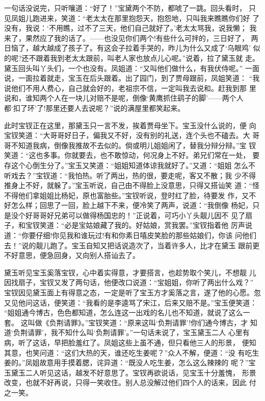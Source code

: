 一句话没说完，只听嚷道：“好了！”宝黛两个不防，都唬了一跳。回头看时，
只见凤姐儿跑进来，笑道：“老太太在那里抱怨天，抱怨地，只叫我来瞧瞧你们好
了没有，我说：‘不用瞧，过不了三天，他们自己就好了。’老太太骂我，说我懒；
我来了，果然应了我的话了。——也没见你们两个!有些什么可拌的，三日好了，
两日恼了，越大越成了孩子了。有这会子拉着手哭的，昨儿为什么又成了‘乌眼鸡’
似的呢?还不跟着我到老太太跟前，叫老人家也放点儿心呢。”说着，拉了黛玉就
走。黛玉回头叫丫头们，一个也没有。凤姐道：“又叫他们做什么，有我伏侍呢。”
一面说，一面拉着就走，宝玉在后头跟着。出了园门，到了贾母跟前，凤姐笑道：
“我说他们不用人费心，自己就会好的，老祖宗不信，一定叫我去说和。赶我到那
里说和，谁知两个人在一块儿对赔不是呢，倒像‘黄鹰抓住鹞子的脚’——两个人
都‘扣了环’了!那里还要人去说呢？”说的满屋里都笑起来。

此时宝钗正在这里，那黛玉只一言不发，挨着贾母坐下。宝玉没什么说的，便
向宝钗笑道：“大哥哥好日子，偏我又不好，没有别的礼送，连个头也不磕去。大
哥哥不知道我病，倒像我推故不去似的。倘或明儿姐姐闲了，替我分辩分辩。”宝
钗笑道：“这也多事。你就要去，也不敢惊动，何况身上不好。弟兄们常在一处，
要存这个心倒生分了。”宝玉又笑道：“姐姐知道体谅我就好了。”又道：“姐姐
怎么不听戏去？”宝钗道：“我怕热。听了两出，热的很，要走呢，客又不散；我
少不得推身上不好，就躲了。”宝玉听说，自己由不得脸上没意思，只得又搭讪笑
道：“怪不得他们拿姐姐比杨妃，原也富胎些。”宝钗听说，登时红了脸，待要发
作，又不好怎么样；回思了一回，脸上越下不来，便冷笑了两声，说道：“我倒像
杨妃，只是没个好哥哥好兄弟可以做得杨国忠的！”正说着，可巧小丫头靓儿因不
见了扇子，和宝钗笑道：“必是宝姑娘藏了我的。好姑娘，赏我罢。”宝钗指着他
厉声说道：“你要仔细!你见我和谁玩过!有和你素日嘻皮笑脸的那些姑娘们，你该
问他们去！”说的靓儿跑了。宝玉自知又把话说造次了，当着许多人，比才在黛玉
跟前更不好意思，便急回身，又向别人搭讪去了。

黛玉听见宝玉奚落宝钗，心中着实得意，才要搭言，也趁势取个笑儿，不想靓
儿因找扇子，宝钗又发了两句话，他便改口说道：“宝姐姐，你听了两出什么戏？”
宝钗因见黛玉面上有得意之态，一定是听了宝玉方才奚落之言，遂了他的心愿。忽
又见他问这话，便笑道：“我看的是李逵骂了宋江，后来又赔不是。”宝玉便笑道：
“姐姐通今博古，色色都知道，怎么连这一出戏的名儿也不知道，就说了这么一套。
这叫做《负荆请罪》。”宝钗笑道：“原来这叫‘负荆请罪’!你们通今博古，才
知道‘负荆请罪’，我不知什么叫‘负荆请罪’。”一句话未说了，宝玉黛玉二人
心里有病，听了这话，早把脸羞红了。凤姐这些上虽不通，但只看他三人的形景，
便知其意，也笑问道：“这们大热的天，谁还吃生姜呢？”众人不解，便道：“没
有吃生姜的。”凤姐故意用手摸着腮，诧异道：“既没人吃生姜，怎么这么辣辣的
呢？”宝玉黛玉二人听见这话，越发不好意思了。宝钗再欲说话，见宝玉十分羞愧，
形景改变，也就不好再说，只得一笑收住。别人总没解过他们四个人的话来，因此
付之一笑。

